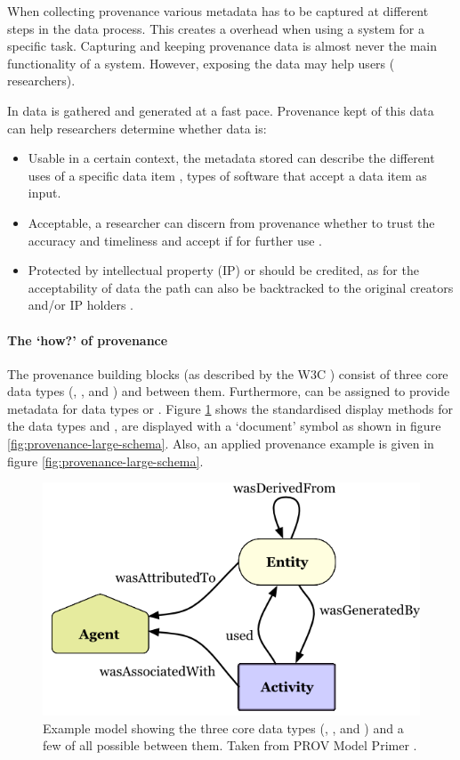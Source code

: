 When collecting provenance various metadata has to be captured at different steps in the data process.
This creates a overhead when using a system for a specific task.
Capturing and keeping provenance data is almost never the main functionality of a system.
However, exposing the data may help users (\ie{} researchers).

In \escience{} data is gathered and generated at a fast pace.
Provenance kept of this data can help researchers determine whether data is:

\begin{itemize}
	\item Usable in a certain context, the metadata stored can describe the different uses of a specific data item \cite{dsp1simmhan}, \eg{} types of software that accept a data item as input.
	\item Acceptable, a researcher can discern from provenance whether to trust the accuracy and timeliness and accept if for further use \cite{dsp1simmhan,dsp3buneman}.
	\item Protected by intellectual property (IP) or should be credited, as for the acceptability of data the path can also be backtracked to the original creators and/or IP holders \cite{dsp1simmhan}.
\end{itemize}

\paragraph{The `how?' of provenance}
\label{provenance-how}

The provenance building blocks (as described by the W3C \cite{dsp8gil}) consist of three core data types (\agent{}, \entity{}, and \activity{}) and \relations{} between them.
Furthermore, \attributes{} can be assigned to provide metadata for data types or \relations{}.
Figure \ref{fig:provenance-overview} shows the standardised display methods for the data types and \relations{}, \attributes{} are displayed with a `document' symbol as shown in figure \ref{fig:provenance-large-schema}.
Also, an applied provenance example is given in figure \ref{fig:provenance-large-schema}.

\begin{figure}[!tbhp]
	\centering
	\includegraphics[width=0.5\linewidth]{images/provenance-overview}
	\caption{Example model showing the three core data types (\agent{}, \entity{}, and \activity{}) and a few of all possible \relations{} between them. 
		Taken from PROV Model Primer \cite{dsp8gil}.}
	\label{fig:provenance-overview}
\end{figure}

